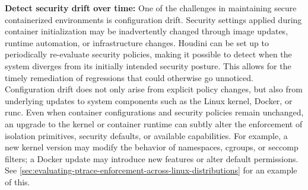 \documentclass[12pt]{report}
\begin{document}
\begin{doublespace}
\noindent\textbf{Detect security drift over time:} One of the challenges in maintaining secure containerized environments is configuration drift. Security settings applied during container initialization may be inadvertently changed through image updates, runtime automation, or infrastructure changes. Houdini can be set up to periodically re-evaluate security policies, making it possible to detect when the system diverges from its initially intended security posture. This allows for the timely remediation of regressions that could otherwise go unnoticed. Configuration drift does not only arise from explicit policy changes, but also from underlying updates to system components such as the Linux kernel, Docker, or runc. Even when container configurations and security policies remain unchanged, an upgrade to the kernel or container runtime can subtly alter the enforcement of isolation primitives, security defaults, or available capabilities. For example, a new kernel version may modify the behavior of namespaces, cgroups, or seccomp filters; a Docker update may introduce new features or alter default permissions. See \ref{sec:evaluating-ptrace-enforcement-across-linux-distributions} for an example of this.
\end{doublespace} \fontsize{12pt}{14pt} \selectfont
\end{document}

